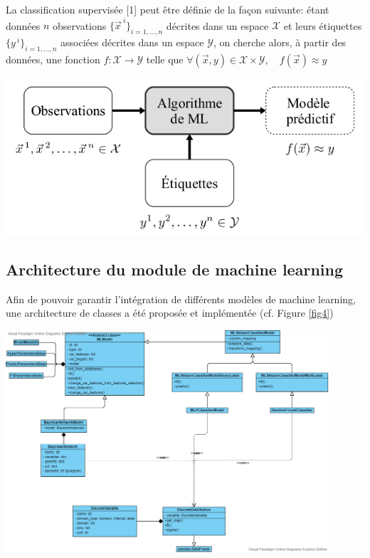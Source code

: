 La classification supervisée [1] peut être définie de la façon suivante: étant données $n$ observations $\lbrace\vec{x}^{\:i}\rbrace_{i=1,...,n}$ décrites dans un espace $\mathcal{X}$ et leurs étiquettes $\lbrace y^{\:i}\rbrace_{i=1,...,n}$ associées décrites dans un espace $\mathcal{Y}$, on cherche alors, à partir des données, une fonction $f:\mathcal{X}\rightarrow\mathcal{Y}$ telle que $\forall(\vec{x},y)\in \mathcal{X}\times\mathcal{Y},\quad f(\vec{x})\approx y$

\begin{center}
\includegraphics[scale=0.8]{figures/apprentissage_supervise.png}
\label{fig3}
\end{center}

\subsection{Architecture du module de machine learning}

Afin de pouvoir garantir l’intégration de différents modèles de machine learning, une architecture de classes a été proposée et implémentée (cf. Figure \ref{fig4})

\begin{center}
\includegraphics[width=0.9\textwidth]{figures/diagramme_classe_ml.png}
\label{fig4}
\end{center}

